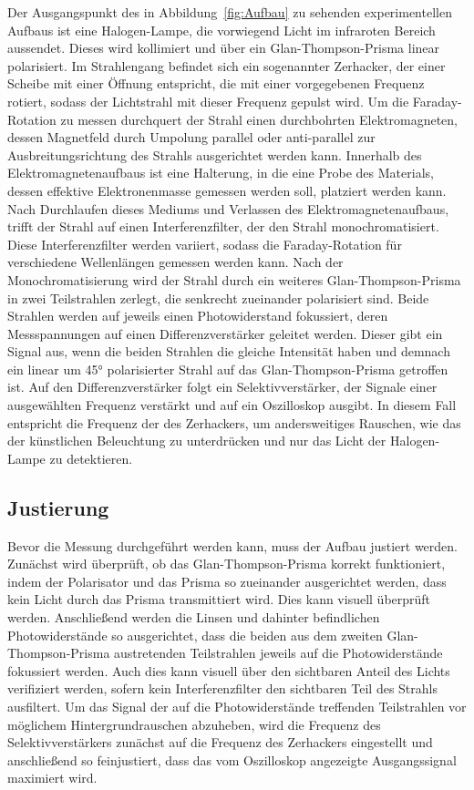         \noindent
        Der Ausgangspunkt des in Abbildung~\ref{fig:Aufbau} zu sehenden experimentellen Aufbaus ist eine Halogen-Lampe, die vorwiegend Licht im infraroten Bereich aussendet. Dieses wird kollimiert und über ein Glan-Thompson-Prisma linear polarisiert. Im Strahlengang befindet sich ein sogenannter Zerhacker, der einer Scheibe mit einer Öffnung entspricht, die mit einer vorgegebenen Frequenz rotiert, sodass der Lichtstrahl mit dieser Frequenz gepulst wird. Um die Faraday-Rotation zu messen durchquert der Strahl einen durchbohrten Elektromagneten, dessen Magnetfeld durch Umpolung parallel oder anti-parallel zur Ausbreitungsrichtung des Strahls ausgerichtet werden kann. Innerhalb des Elektromagnetenaufbaus ist eine Halterung, in die eine Probe des Materials, dessen effektive Elektronenmasse gemessen werden soll, platziert werden kann. Nach Durchlaufen dieses Mediums und Verlassen des Elektromagnetenaufbaus, trifft der Strahl auf einen Interferenzfilter, der den Strahl monochromatisiert. Diese Interferenzfilter werden variiert, sodass die Faraday-Rotation für verschiedene Wellenlängen gemessen werden kann. Nach der Monochromatisierung wird der Strahl durch ein weiteres Glan-Thompson-Prisma in zwei Teilstrahlen zerlegt, die senkrecht zueinander polarisiert sind. Beide Strahlen werden auf jeweils einen Photowiderstand fokussiert, deren Messspannungen auf einen Differenzverstärker geleitet werden. Dieser gibt ein Signal aus, wenn die beiden Strahlen die gleiche Intensität haben und demnach ein linear um 45° polarisierter Strahl auf das Glan-Thompson-Prisma getroffen ist. Auf den Differenzverstärker folgt ein Selektivverstärker, der Signale einer ausgewählten Frequenz verstärkt und auf ein Oszilloskop ausgibt. In diesem Fall entspricht die Frequenz der des Zerhackers, um andersweitiges Rauschen, wie das der künstlichen Beleuchtung zu unterdrücken und nur das Licht der Halogen-Lampe zu detektieren.

    \subsection{Justierung}
        Bevor die Messung durchgeführt werden kann, muss der Aufbau justiert werden. Zunächst wird überprüft, ob das Glan-Thompson-Prisma korrekt funktioniert, indem der Polarisator und das Prisma so 
        zueinander ausgerichtet werden, dass kein Licht durch das Prisma transmittiert wird. Dies kann visuell überprüft werden. \newline
        Anschließend werden die Linsen und dahinter befindlichen Photowiderstände so ausgerichtet, dass die beiden aus dem zweiten Glan-Thompson-Prisma austretenden Teilstrahlen jeweils auf die Photowiderstände
        fokussiert werden. Auch dies kann visuell über den sichtbaren Anteil des Lichts verifiziert werden, sofern kein Interferenzfilter den sichtbaren Teil des Strahls ausfiltert. \newline
        Um das Signal der auf die Photowiderstände treffenden Teilstrahlen vor möglichem Hintergrundrauschen abzuheben, wird die Frequenz des Selektivverstärkers zunächst auf die Frequenz des Zerhackers eingestellt und anschließend so feinjustiert, dass das vom Oszilloskop angezeigte Ausgangssignal maximiert wird.  
